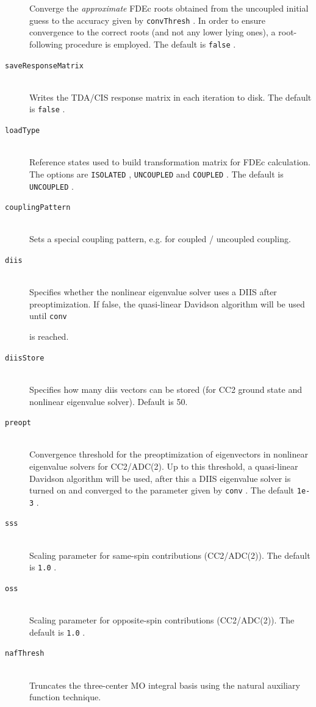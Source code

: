 \documentclass[bibliography=totocnumbered,a4paper,10pt,oneside]{scrbook}
\newcommand{\ttt}[1]{%
  \begingroup\setlength{\fboxsep}{1pt}%
  \colorbox{serenity-green!30}{\texttt{\hspace*{2pt}\vphantom{(g}#1\hspace*{2pt}}}%
  \endgroup
}
\begin{document}
\begin{description}
    Converge the \emph{approximate} FDEc roots obtained from the uncoupled initial guess to the accuracy given by \ttt{convThresh}. In order to ensure convergence to the correct roots (and not any lower lying ones), a root-following procedure is employed. The default is \ttt{false}.
    \item [\texttt{saveResponseMatrix}]\hfill \\
    Writes the TDA/CIS response matrix in each iteration to disk. The default is \ttt{false}.
    \item [\texttt{loadType}]\hfill \\
    Reference states used to build transformation matrix for FDEc calculation. The options are \ttt{ISOLATED}, \ttt{UNCOUPLED} and \ttt{COUPLED}. The default is \ttt{UNCOUPLED}.
    \item[\texttt{couplingPattern}]\hfill\\
    Sets a special coupling pattern, e.g. for coupled / uncoupled coupling.
    \item[\texttt{diis}]\hfill\\
    Specifies whether the nonlinear eigenvalue solver uses a DIIS after preoptimization. If false, the quasi-linear Davidson algorithm will be used until \ttt{conv}
    is reached.
    \item[\texttt{diisStore}]\hfill\\
    Specifies how many diis vectors can be stored (for CC2 ground state and nonlinear
    eigenvalue solver). Default is 50.
    \item[\texttt{preopt}]\hfill\\
    Convergence threshold for the preoptimization of eigenvectors in nonlinear
    eigenvalue solvers for CC2/ADC(2). Up to this threshold, a quasi-linear
    Davidson algorithm will be used, after this a DIIS eigenvalue solver 
    is turned on and converged to the parameter given by \ttt{conv}. The default \ttt{1e-3}.
    \item[\texttt{sss}]\hfill\\
    Scaling parameter for same-spin contributions (CC2/ADC(2)). The default is \ttt{1.0}.
    \item[\texttt{oss}]\hfill\\
    Scaling parameter for opposite-spin contributions (CC2/ADC(2)). The default is \ttt{1.0}.
    \item[\texttt{nafThresh}]\hfill\\
    Truncates the three-center MO integral basis using the natural auxiliary function technique.

\end{description}
\end{document}
